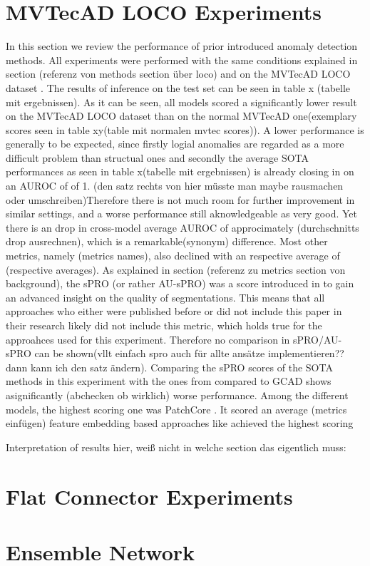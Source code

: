 \section{MVTecAD LOCO Experiments}
\label{sec:locoxperiments}
In this section we review the performance of prior introduced anomaly detection methods. All experiments were performed with the same 
conditions explained in section (referenz von methods section über loco) 
and on the MVTecAD LOCO dataset \cite{LOCODentsAndScratchesBergmann2022}. 
The results of inference on the test set can be seen in table x (tabelle mit ergebnissen). As it can be seen, all models scored a significantly 
lower result on the MVTecAD LOCO dataset than on the normal MVTecAD one(exemplary scores seen in table xy(table mit normalen mvtec scores)). 
A lower performance is generally to be expected, since firstly logial anomalies are regarded as a more difficult problem than structual 
ones and secondly the average SOTA performances as seen in table x(tabelle mit ergebnissen) is already closing in on an AUROC of of 1. 
(den satz rechts von hier müsste man maybe rausmachen oder umschreiben)Therefore there is not much room for further improvement in similar settings, and a worse performance still aknowledgeable as very good. 
Yet there is an drop in cross-model average AUROC of approcimately (durchschnitts drop ausrechnen), which is a remarkable(synonym) difference. 
Most other metrics, namely (metrics names), also declined with an respective average of (respective averages). As explained in section 
(referenz zu metrics section von background), the sPRO (or rather AU-sPRO) was a score introduced in \cite{LOCODentsAndScratchesBergmann2022} to gain an 
advanced insight on the quality of segmentations. This means that all approaches who either were published before or did not include this 
paper in their research likely did not include this metric, which holds true for the approahces used for this experiment. Therefore no comparison 
in sPRO/AU-sPRO can be shown(vllt einfach spro auch für allte ansätze implementieren?? dann kann ich den satz ändern). Comparing the sPRO 
scores of the SOTA methods in this experiment with the ones from compared to GCAD \cite{LOCODentsAndScratchesBergmann2022} shows asignificantly 
(abchecken ob wirklich) worse performance.
Among the different models, the highest scoring one was PatchCore \cite{patchCore2022}. It scored an average (metrics einfügen) feature embedding based approaches like  
achieved the highest scoring

Interpretation of results hier, weiß nicht in welche section das eigentlich muss:


\section{Flat Connector Experiments}
\label{sec:faltconnectorxperiments}


\section{Ensemble Network}
\label{sec:ensembleresults}




